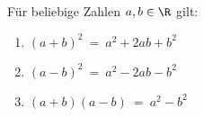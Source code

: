 Für beliebige Zahlen $a, b \in \R$ gilt:
\begin{enumerate}[label=(\arabic*)]
    \setlength{\labelsep}{10pt}
    \item $(a+b)^2 \ = \ a^2 + 2ab + b^2$
    \item $(a-b)^2 \ = \ a^2 - 2ab - b^2$
    \item $(a+b)(a-b) \ = \ a^2 - b^2$
\end{enumerate}